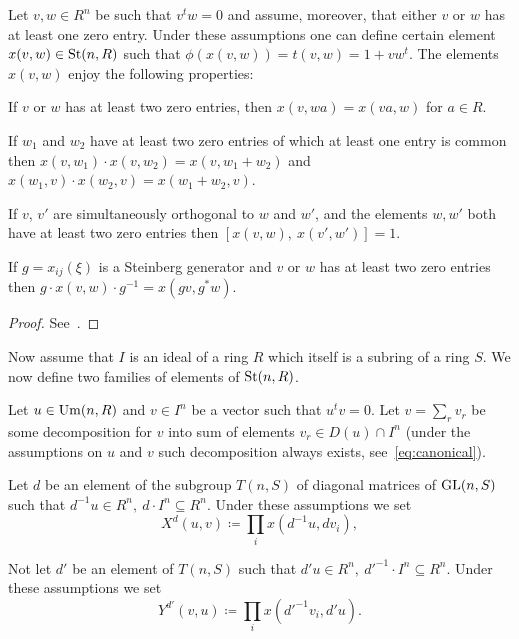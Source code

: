 \begin{lemma}
    \label{lem:xsmall-properties}
    Let $v, w \in R^n$ be such that $v^t w = 0$ and assume, moreover, that either $v$ or $w$ has at least one zero entry.
    Under these assumptions one can define certain element $x(v, w) \in \operatorname{St}(n, R)$ such that $\phi(x(v, w)) = t(v, w) = 1 + vw^t$.
    The elements $x(v, w)$ enjoy the following properties:
    \begin{lemlist}
        \item \label{itm:xsmall-scalar} If $v$ or $w$ has at least two zero entries, then $x(v, wa) = x(va, w)$ for $a\in R$.
        \item \label{itm:xsmall-additivity} If $w_1$ and $w_2$ have at least two zero entries of which at least one entry is common
        then $x(v, w_1) \cdot x(v, w_2) = x(v, w_1+w_2)$ and $x(w_1, v) \cdot x(w_2, v) = x(w_1 + w_2, v)$.
        \item \label{itm:xsmall-commute} If $v$, $v'$ are simultaneously orthogonal to $w$ and $w'$, and the elements $w, w'$ both have at least two zero entries then
        $[x(v, w),\ x(v', w')] = 1$.
        \item \label{itm:xsmall-conj} If $g = x_{ij}(\xi)$ is a Steinberg generator and $v$ or $w$ has at least two zero entries then
        $g \cdot x(v, w) \cdot g^{-1} = x(gv, g^*w)$.
    \end{lemlist}
\end{lemma}
\begin{proof}
    See~\cite[Lemma~1.1]{Tu83}.
\end{proof}

Now assume that $I$ is an ideal of a ring $R$ which itself is a subring of a ring $S$.
We now define two families of elements of $\operatorname{St}(n, R)$.
\begin{dfn}
    Let $u \in \operatorname{Um}(n, R)$ and $v \in I^n$ be a vector such that $u^{t}v = 0$.
    Let $v = \sum_r v_r$ be some decomposition for $v$ into sum of elements $v_r \in D(u) \cap I^n$
    (under the assumptions on $u$ and $v$ such decomposition always exists, see~\eqref{eq:canonical}).

    Let $d$ be an element of the subgroup $T(n, S)$ of diagonal matrices of $\operatorname{GL}(n, S)$ such that
    $d^{-1}u \in R^n,\ d \cdot I^n \subseteq R^n.$
    Under these assumptions we set
    \begin{equation*}
        X^d(u, v) \coloneqq \prod_i x(d^{-1}u, dv_i),
    \end{equation*}

    Not let $d'$ be an element of $T(n, S)$ such that $d' u\in R^n,\ {d'}^{-1} \cdot I^n \subseteq R^n$.
    Under these assumptions we set
    \begin{equation*}
        Y^{d'}(v, u) \coloneqq \prod_i x({d'}^{-1} v_i, {d'}u).
    \end{equation*}
\end{dfn}

